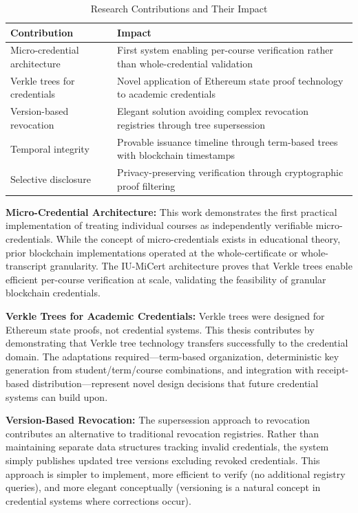 \begin{table}[H]
\centering
\caption{Research Contributions and Their Impact}
\label{tab:contributions}
\begin{tabular}{|p{5.5cm}|p{7.5cm}|}
\hline
\textbf{Contribution} & \textbf{Impact} \\
\hline
Micro-credential architecture & First system enabling per-course verification rather than whole-credential validation \\
\hline
Verkle trees for credentials & Novel application of Ethereum state proof technology to academic credentials \\
\hline
Version-based revocation & Elegant solution avoiding complex revocation registries through tree supersession \\
\hline
Temporal integrity & Provable issuance timeline through term-based trees with blockchain timestamps \\
\hline
Selective disclosure & Privacy-preserving verification through cryptographic proof filtering \\
\hline
\end{tabular}
\end{table}

\textbf{Micro-Credential Architecture:} This work demonstrates the first practical implementation of treating individual courses as independently verifiable micro-credentials. While the concept of micro-credentials exists in educational theory, prior blockchain implementations operated at the whole-certificate or whole-transcript granularity. The IU-MiCert architecture proves that Verkle trees enable efficient per-course verification at scale, validating the feasibility of granular blockchain credentials.

\textbf{Verkle Trees for Academic Credentials:} Verkle trees were designed for Ethereum state proofs, not credential systems. This thesis contributes by demonstrating that Verkle tree technology transfers successfully to the credential domain. The adaptations required—term-based organization, deterministic key generation from student/term/course combinations, and integration with receipt-based distribution—represent novel design decisions that future credential systems can build upon.

\textbf{Version-Based Revocation:} The supersession approach to revocation contributes an alternative to traditional revocation registries. Rather than maintaining separate data structures tracking invalid credentials, the system simply publishes updated tree versions excluding revoked credentials. This approach is simpler to implement, more efficient to verify (no additional registry queries), and more elegant conceptually (versioning is a natural concept in credential systems where corrections occur).

